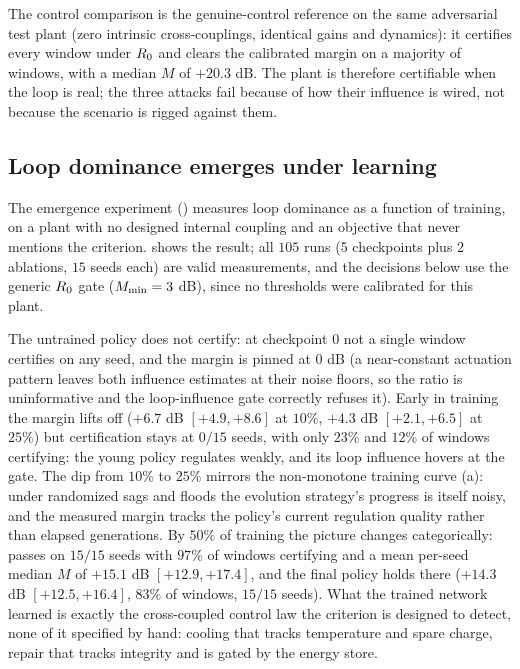 \documentclass[11pt]{article}
\begin{document}
The control comparison is the genuine-control reference on the same adversarial test plant (zero intrinsic cross-couplings, identical gains and dynamics): it certifies every window under $R_0$ and clears the calibrated margin on a majority of windows, with a median $M$ of $+20.3$ dB. The plant is therefore certifiable when the loop is real; the three attacks fail because of how their influence is wired, not because the scenario is rigged against them.

\subsection{Loop dominance emerges under learning}
\label{sec:results_emergence}

The emergence experiment () measures loop dominance as a function of training, on a plant with no designed internal coupling and an objective that never mentions the criterion.  shows the result; all $105$ runs ($5$ checkpoints plus $2$ ablations, $15$ seeds each) are valid measurements, and the decisions below use the generic $R_0$ gate ($M_{\min} = 3$ dB), since no thresholds were calibrated for this plant.

The untrained policy does not certify: at checkpoint $0$ not a single window certifies on any seed, and the margin is pinned at $0$ dB (a near-constant actuation pattern leaves both influence estimates at their noise floors, so the ratio is uninformative and the loop-influence gate correctly refuses it). Early in training the margin lifts off ($+6.7$ dB $[+4.9, +8.6]$ at $10\%$, $+4.3$ dB $[+2.1, +6.5]$ at $25\%$) but certification stays at $0/15$ seeds, with only $23\%$ and $12\%$ of windows certifying: the young policy regulates weakly, and its loop influence hovers at the gate. The dip from $10\%$ to $25\%$ mirrors the non-monotone training curve (a): under randomized sags and floods the evolution strategy's progress is itself noisy, and the measured margin tracks the policy's current regulation quality rather than elapsed generations. By $50\%$ of training the picture changes categorically: \NC passes on $15/15$ seeds with $97\%$ of windows certifying and a mean per-seed median $M$ of $+15.1$ dB $[+12.9, +17.4]$, and the final policy holds there ($+14.3$ dB $[+12.5, +16.4]$, $83\%$ of windows, $15/15$ seeds). What the trained network learned is exactly the cross-coupled control law the criterion is designed to detect, none of it specified by hand: cooling that tracks temperature and spare charge, repair that tracks integrity and is gated by the energy store.
\end{document}
